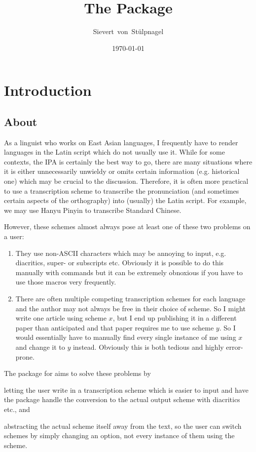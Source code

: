 \documentclass{ltxdockit}
\title{The \transconv{} Package}
\author{Sievert\ von\ St\"{u}lpnagel}
\date{\today}
\begin{document}
\maketitle

\tableofcontents
\listoftables

\section{Introduction}
\label{int}

\subsection[About]{About \transconv{}}

As a linguist who works on East Asian languages, I frequently have to render
languages in the Latin script which do not usually use it. While for some
contexts, the IPA is certainly the best way to go, there are many situations
where it is either unnecessarily unwieldy or omits certain information (e.g.
historical one) which may be crucial to the discussion. Therefore, it is often
more practical to use a transcription scheme to transcribe the pronunciation
(and sometimes certain aspects of the orthography) into (usually) the Latin
script. For example, we may use Hanyu Pinyin to transcribe Standard Chinese.

However, these schemes almost always pose at least one of these two problems on
a  user:

\begin{enumerate}
  \item They use non-ASCII characters which may be annoying to input, e.g.
    diacritics, super- or subscripts etc. Obviously it is possible to do this
    manually with  commands but it can be extremely
    obnoxious if you
    have to use those macros very frequently.
  \item There are often multiple competing transcription schemes for each
    language and the author may not always be free in their choice of scheme.
    So I might write one article using scheme \(x\), but I end up publishing it
    in a different paper than anticipated and that paper requires me to use
    scheme \(y\). So I would essentially have to manually find every single
    instance of me using \(x\) and change it to \(y\) instead. Obviously this is
    both tedious and highly error-prone.
\end{enumerate}

The \transconv{} package for  aims to solve these problems by
\begin{enumerate*}[label=\alph*)]
\item letting the user write in a transcription scheme which is easier to
input and have the package handle the conversion to the actual output scheme
with diacritics etc., and
\item abstracting the actual scheme itself away from the text, so the user can
switch schemes by simply changing an option, not every instance of them
using the scheme.
\end{enumerate*}
\end{document}
